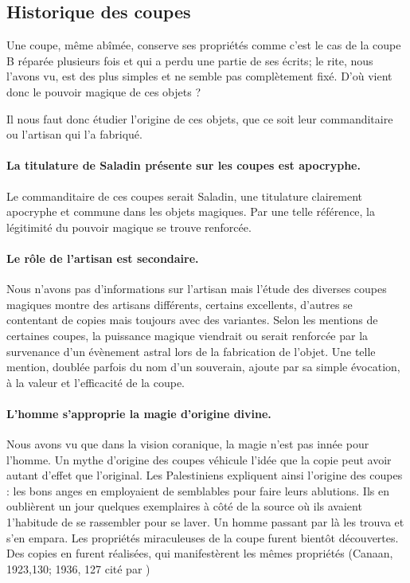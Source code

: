 \subsection*{Historique des coupes}
Une coupe, même abîmée, conserve ses propriétés comme c'est le cas de la coupe B réparée plusieurs fois et qui a perdu une partie de ses écrits; le rite, nous l'avons vu, est des plus simples et ne semble pas complètement fixé. D'où vient donc le pouvoir magique de ces objets ? 

Il nous faut donc étudier l'origine de ces objets, que ce soit leur commanditaire ou l'artisan qui l'a fabriqué.

\paragraph{La titulature de Saladin présente sur les coupes est apocryphe.} Le commanditaire de ces coupes serait Saladin, une titulature clairement apocryphe et commune dans les objets magiques. Par une telle référence, la légitimité du pouvoir magique se trouve renforcée. 

 


\paragraph{Le rôle de l'artisan est secondaire.} Nous n'avons pas d'informations sur l'artisan mais l'étude des diverses coupes magiques montre des artisans différents, certains excellents, d'autres se contentant de copies mais toujours avec des variantes. 
Selon les mentions de certaines coupes, la puissance magique viendrait ou serait renforcée par la survenance d'un évènement astral lors de la fabrication de l'objet. Une telle mention, doublée parfois du nom d'un souverain,  ajoute par sa simple évocation, à la valeur et l'efficacité de la coupe.  
\paragraph{L'homme s'approprie la magie d'origine divine.} Nous avons vu que dans la vision coranique, la magie n'est pas innée pour l'homme.
Un mythe d’origine
des coupes véhicule l’idée que la copie peut avoir autant d’effet que
l’original. Les Palestiniens expliquent
ainsi l'origine des coupes : les bons anges en employaient de semblables
pour faire leurs ablutions. Ils en oublièrent un jour quelques exemplaires
à côté de la source où ils avaient 1'habitude de se rassembler pour se
laver. Un homme passant par là les trouva et s'en empara. Les propriétés
miraculeuses de la coupe furent bientôt découvertes. Des copies en furent
réalisées, qui manifestèrent les mêmes propriétés (Canaan, 1923,130;
1936, 127 cité par \cite{Regourd_2007})

